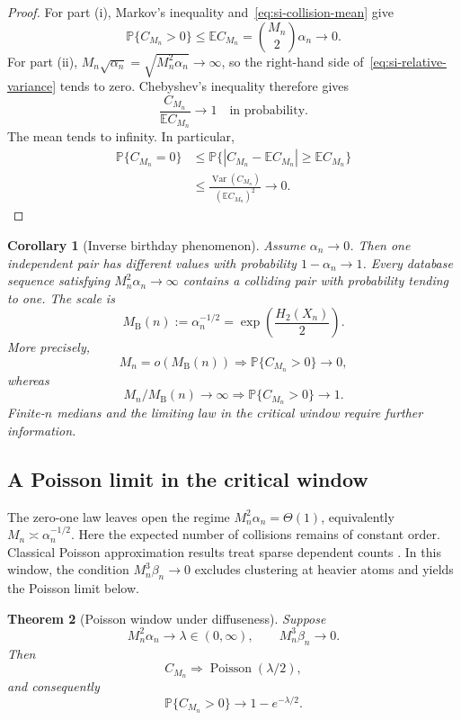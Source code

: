 \documentclass[9pt,twoside]{pnas-new}
\newtheorem{theorem}{Theorem}
\newtheorem{corollary}[theorem]{Corollary}
\theoremstyle{definition}
\theoremstyle{remark}
\renewcommand{\Pr}{\mathbb{P}}
\begin{document}
\begin{proof}
For part (i), Markov's inequality and~\eqref{eq:si-collision-mean} give
\[
\Pr\{C_{M_n}>0\}
\le\mathbb E C_{M_n}
=\binom{M_n}{2}\alpha_n\to0.
\]
For part (ii), $M_n\sqrt{\alpha_n}=\sqrt{M_n^2\alpha_n}\to\infty$, so the right-hand side of~\eqref{eq:si-relative-variance} tends to zero. Chebyshev's inequality therefore gives
\[
\frac{C_{M_n}}{\mathbb E C_{M_n}}
\longrightarrow1
\quad\text{in probability}.
\]
The mean tends to infinity. In particular,
\begin{align*}
\Pr\{C_{M_n}=0\}
&\le
\Pr\{|C_{M_n}-\mathbb E C_{M_n}|
       \ge\mathbb E C_{M_n}\}\\
&\le
\frac{\operatorname{Var}(C_{M_n})}
     {(\mathbb E C_{M_n})^2}
\longrightarrow0.
\end{align*}
\end{proof}

\begin{corollary}[Inverse birthday phenomenon]
\label{cor:si-inverse-birthday}
Assume $\alpha_n\to0$. Then one independent pair has different values with probability $1-\alpha_n\to1$. Every database sequence satisfying $M_n^2\alpha_n\to\infty$ contains a colliding pair with probability tending to one. The scale is
\begin{equation}
M_{\mathrm B}(n):=\alpha_n^{-1/2}
=\exp\!\left(\frac{H_2(X_n)}{2}\right).
\label{eq:si-birthday-scale}
\end{equation}
More precisely,
\[
M_n=o(M_{\mathrm B}(n))
\Longrightarrow
\Pr\{C_{M_n}>0\}\to0,
\]
whereas
\[
M_n/M_{\mathrm B}(n)\to\infty
\Longrightarrow
\Pr\{C_{M_n}>0\}\to1.
\]
Finite-$n$ medians and the limiting law in the critical window require further information.
\end{corollary}

\subsection{A Poisson limit in the critical window}
The zero-one law leaves open the regime $M_n^2\alpha_n=\Theta(1)$, equivalently $M_n\asymp\alpha_n^{-1/2}$. Here the expected number of collisions remains of constant order. Classical Poisson approximation results treat sparse dependent counts \cite{arratiagoldsteingordon1989,barbourholstjanson1992}. In this window, the condition $M_n^3\beta_n\to0$ excludes clustering at heavier atoms and yields the Poisson limit below.

\begin{theorem}[Poisson window under diffuseness]
\label{thm:si-poisson-window}
Suppose
\begin{equation}
M_n^2\alpha_n\longrightarrow\lambda\in(0,\infty),
\qquad
M_n^3\beta_n\longrightarrow0.
\label{eq:si-poisson-hypotheses}
\end{equation}
Then
\begin{equation}
C_{M_n}\Longrightarrow
\operatorname{Poisson}(\lambda/2),
\label{eq:si-poisson-limit}
\end{equation}
and consequently
\[
\Pr\{C_{M_n}>0\}
\longrightarrow1-e^{-\lambda/2}.
\]
\end{theorem}
\end{document}
